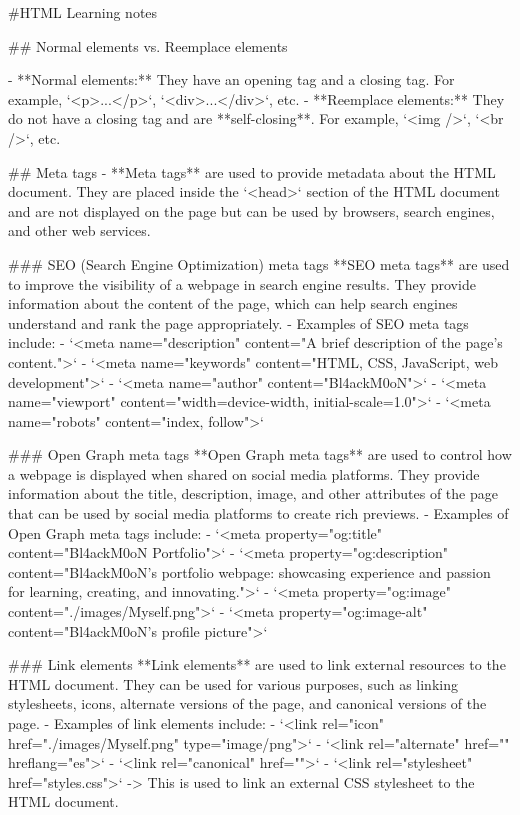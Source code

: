 #HTML Learning notes

## Normal elements vs. Reemplace elements

- **Normal elements:** They have an opening tag and a closing tag. For example, `<p>...</p>`, `<div>...</div>`, etc.
- **Reemplace elements:** They do not have a closing tag and are **self-closing**. For example, `<img />`, `<br />`, etc.


## Meta tags
- **Meta tags** are used to provide metadata about the HTML document. They are placed inside the `<head>` section of the HTML document and are not displayed on the page but can be used by browsers, search engines, and other web services.

### SEO (Search Engine Optimization) meta tags
**SEO meta tags** are used to improve the visibility of a webpage in search engine results. They provide information about the content of the page, which can help search engines understand and rank the page appropriately.
- Examples of SEO meta tags include:
    - `<meta name="description" content="A brief description of the page's content.">`
    - `<meta name="keywords" content="HTML, CSS, JavaScript, web development">`
    - `<meta name="author" content="Bl4ackM0oN">`
    - `<meta name="viewport" content="width=device-width, initial-scale=1.0">`
    - `<meta name="robots" content="index, follow">`

### Open Graph meta tags
**Open Graph meta tags** are used to control how a webpage is displayed when shared on social media platforms. They provide information about the title, description, image, and other attributes of the page that can be used by social media platforms to create rich previews.
- Examples of Open Graph meta tags include:
    - `<meta property="og:title" content="Bl4ackM0oN Portfolio">`
    - `<meta property="og:description" content="Bl4ackM0oN's portfolio webpage: showcasing experience and passion for learning, creating, and innovating.">`
    - `<meta property="og:image" content="./images/Myself.png">`
    - `<meta property="og:image-alt" content="Bl4ackM0oN's profile picture">`

### Link elements
**Link elements** are used to link external resources to the HTML document. They can be used for various purposes, such as linking stylesheets, icons, alternate versions of the page, and canonical versions of the page.
- Examples of link elements include:
    - `<link rel="icon" href="./images/Myself.png" type="image/png">`
    - `<link rel="alternate" href="" hreflang="es">`
    - `<link rel="canonical" href="">`
    - `<link rel="stylesheet" href="styles.css">` -> This is used to link an external CSS stylesheet to the HTML document.


